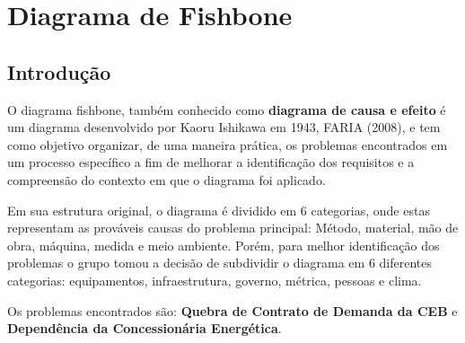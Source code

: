 \section{Diagrama de Fishbone}
\subsection {Introdução}
O diagrama fishbone, também conhecido como \textbf {diagrama de causa e efeito} é um diagrama desenvolvido por Kaoru Ishikawa em 1943, FARIA (2008), e tem como objetivo organizar, de uma maneira prática, os problemas encontrados em um processo específico a fim de melhorar a identificação dos requisitos e a compreensão do contexto em que o diagrama foi aplicado.
\par Em sua estrutura original, o diagrama é dividido em 6 categorias, onde estas representam as prováveis causas do problema principal: Método, material, mão de obra, máquina, medida e meio ambiente. Porém, para melhor identificação dos problemas o grupo tomou a decisão de subdividir o diagrama em 6 diferentes categorias: equipamentos, infraestrutura, governo, métrica, pessoas e clima.
\par Os problemas encontrados são: \textbf {Quebra de Contrato de Demanda da CEB} e \textbf {Dependência da Concessionária Energética}.

